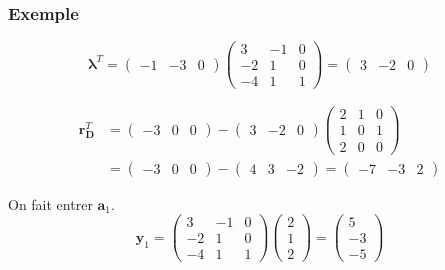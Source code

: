 \documentclass[usepdftitle=false]{beamer}
\def\ba{\boldsymbol{a}}
\def\br{\boldsymbol{r}}
\def\by{\boldsymbol{y}}
\def\bD{\boldsymbol{D}}
\def\blambda{\boldsymbol{\lambda}}
\begin{document}
\begin{frame}
\frametitle{Exemple}

\[
\blambda^T =
\begin{pmatrix}
-1 & -3 & 0
\end{pmatrix}
\begin{pmatrix}
3 & -1 & 0 \\
-2 & 1 & 0 \\
-4 & 1 & 1
\end{pmatrix}
=
\begin{pmatrix}
3 & -2 & 0
\end{pmatrix}
\]

\mbox{}

\begin{align*}
\br_{\bD}^T &=
\begin{pmatrix}
-3 & 0 & 0
\end{pmatrix}
- \begin{pmatrix}
3 & -2 & 0
\end{pmatrix}
\begin{pmatrix}
2 & 1 & 0 \\
1 & 0 & 1 \\
2 & 0 & 0
\end{pmatrix} \\
&=
\begin{pmatrix}
-3 & 0 & 0
\end{pmatrix}
- \begin{pmatrix}
4 & 3 & -2
\end{pmatrix}
=
\begin{pmatrix}
-7 & -3 & 2
\end{pmatrix}
\end{align*}

\mbox{}

On fait entrer $\ba_1$.
\[
\by_1 = 
\begin{pmatrix}
  3 & -1 & 0 \\
 -2 & 1 & 0 \\
 -4 & 1 & 1
\end{pmatrix}
\begin{pmatrix}
 2 \\
 1 \\
 2 
\end{pmatrix}
=
\begin{pmatrix}
  5 \\
 -3 \\
 -5 
\end{pmatrix}
\]

\end{frame}
\end{document}
